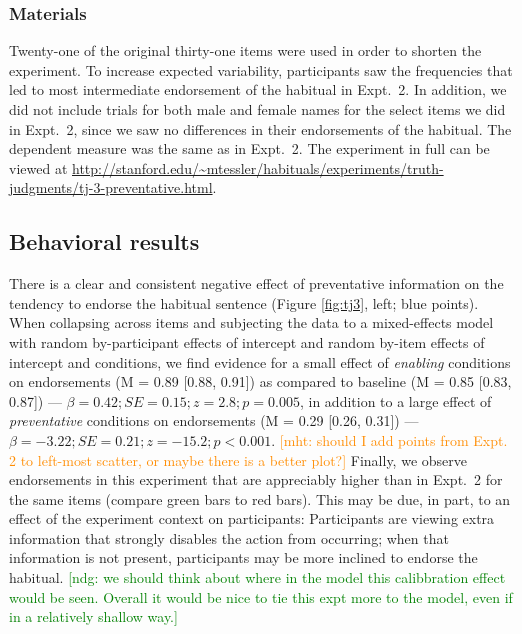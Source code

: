 \documentclass[10pt,letterpaper]{article}
\newcommand{\ndg}[1]{\textcolor{Green}{[ndg: #1]}}
\newcommand{\mht}[1]{\textcolor{DarkOrange}{[mht: #1]}}
\begin{document}
\subsubsection{Materials}

Twenty-one of the original thirty-one items were used in order to shorten the experiment.
To increase expected variability, participants saw the frequencies that led to most intermediate endorsement of the habitual in Expt.~2. 
In addition, we did not include trials for both male and female names for the select items we did in Expt.~2, since we saw no differences in their endorsements of the habitual.
The dependent measure was the same as in Expt.~2. 
The experiment in full can be viewed at \url{http://stanford.edu/~mtessler/habituals/experiments/truth-judgments/tj-3-preventative.html}.

\subsection{Behavioral results}

There is a clear and consistent negative effect of preventative information on the tendency to endorse the habitual sentence (Figure \ref{fig:tj3}, left; blue points).
When collapsing across items and subjecting the data to a mixed-effects model with random by-participant effects of intercept and random by-item effects of intercept and conditions, we find evidence for a small effect of \emph{enabling} conditions on endorsements (M =  0.89 [0.88, 0.91]) as compared to baseline (M = 0.85 [0.83, 0.87]) --- $\beta = 0.42; SE = 0.15; z = 2.8; p = 0.005$, in addition to a large effect of \emph{preventative} conditions on endorsements (M = 0.29 [0.26, 0.31]) --- $\beta = -3.22; SE = 0.21; z = -15.2; p < 0.001$. 
\mht{should I add points from Expt. 2 to left-most scatter, or maybe there is a better plot?}
Finally, we observe endorsements in this experiment that are appreciably higher than in Expt.~2 for the same items (compare green bars to red bars).
This may be due, in part, to an effect of the experiment context on participants: Participants are viewing extra information that strongly disables the action from occurring; when that information is not present, participants may be more inclined to endorse the habitual.
\ndg{we should think about where in the model this calibbration effect would be seen. Overall it would be nice to tie this expt more to the model, even if in a relatively shallow way.}

\end{document}
